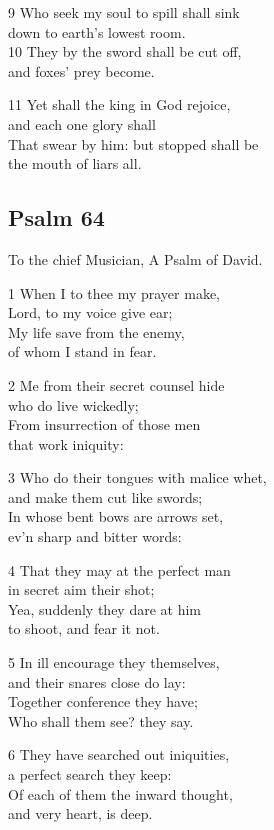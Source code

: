 \begin{multicols}{3}
9 Who seek my soul to spill shall sink\\
down to earth’s lowest room.\\
10 They by the sword shall be cut off,\\
and foxes’ prey become.

11 Yet shall the king in God rejoice,\\
and each one glory shall\\
That swear by him: but stopped shall be\\
the mouth of liars all.

\begin{center}
\quad{}\quad{}
\end{center}

\subsection*{Psalm 64}

To the chief Musician,
A Psalm of David.

1 When I to thee my prayer make,\\
Lord, to my voice give ear;\\
My life save from the enemy,\\
of whom I stand in fear.

2 Me from their secret counsel hide\\
who do live wickedly;\\
From insurrection of those men\\
that work iniquity:

3 Who do their tongues with malice whet,\\
and make them cut like swords;\\
In whose bent bows are arrows set,\\
ev’n sharp and bitter words:

4 That they may at the perfect man\\
in secret aim their shot;\\
Yea, suddenly they dare at him\\
to shoot, and fear it not.

5 In ill encourage they themselves,\\
and their snares close do lay:\\
Together conference they have;\\
Who shall them see? they say.

6 They have searched out iniquities,\\
a perfect search they keep:\\
Of each of them the inward thought,\\
and very heart, is deep.


\end{multicols}
